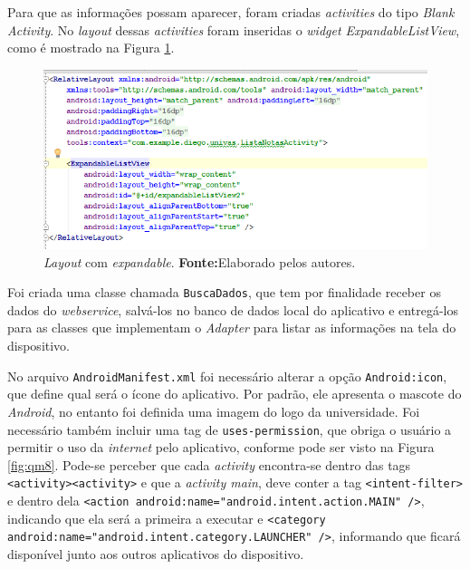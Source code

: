 	\par Para que as informações possam aparecer, foram criadas
\textit{activities} do tipo \textit{Blank Activity}. No \textit{layout} dessas
\textit{activities} foram inseridas o \textit{widget ExpandableListView}, como
	é mostrado na Figura \ref{fig:qm7}.
	

		\begin{figure}[h!]
			\centerline{\includegraphics[scale=0.4]{./imagens/2_q_metodologico/qm7.png}}
			\caption[\textit{Layout} com \textit{expandable}]{\textit{Layout} com
			\textit{expandable}.
			 \textbf{Fonte:}Elaborado pelos autores.}
			\label{fig:qm7}
		\end{figure}		
		
	
		
		
	\par Foi criada uma classe chamada \texttt{BuscaDados}, que tem por finalidade
receber os dados do \textit{webservice}, salvá-los no banco de dados local do
aplicativo e entregá-los para as classes que implementam o \textit{Adapter}
para listar as informações na tela do dispositivo.
	
	\par No arquivo \texttt{AndroidManifest.xml} foi necessário alterar a opção
\texttt{Android:icon}, que define qual será o ícone do aplicativo. Por padrão,
ele apresenta o mascote do \textit{Android}, no entanto foi definida uma imagem
do logo da universidade. Foi necessário também incluir uma tag de
\texttt{uses-permission}, que obriga o usuário a permitir o uso da
\textit{internet} pelo aplicativo, conforme pode ser visto na Figura
\ref{fig:qm8}. Pode-se perceber que cada \textit{activity} encontra-se
dentro das tags \texttt{<activity><\/activity>} e que a \textit{activity main},
deve conter a tag \texttt{<intent-filter>} e dentro dela {\tiny{\texttt{<action
android:name="android.intent.action.MAIN" />}}}, indicando que
ela será a primeira a executar e {\tiny{\texttt{<category
android:name="android.intent.category.LAUNCHER" />}}}, informando que ficará
disponível junto aos outros aplicativos do dispositivo.
	
